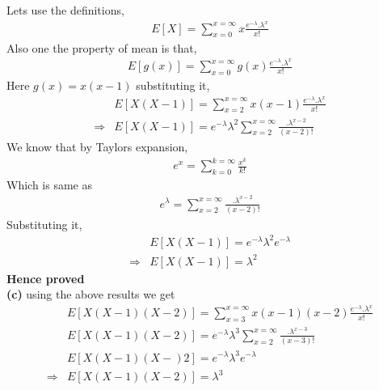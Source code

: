 \documentclass[journal,12pt,twocolumn]{IEEEtran}
\begin{document}
Lets use the definitions,
\begin{align}
E[X]=\sum^{x=\infty}_{x=0}x\frac{e^{-\lambda}.\lambda^{x}}{x!}  
\end{align}
Also one the property of mean is that,
\begin{align}
    E[g(x)]=\sum^{x=\infty}_{x=0}g(x)\frac{e^{-\lambda}.\lambda^{x}}{x!}  
\end{align}
Here $g(x)=x(x-1)$ substituting it,
\begin{align}
    &E[X(X-1)]=\sum^{x=\infty}_{x=2}x(x-1)\frac{e^{-\lambda}.\lambda^{x}}{x!} \\
    \Rightarrow &E[X(X-1)]=e^{-\lambda}\lambda^{2}\sum^{x=\infty}_{x=2}\frac{.\lambda^{x-2}}{(x-2)!}
\end{align}
We know that by Taylors expansion,
\begin{align}
    e^{x}=\sum^{k=\infty}_{k=0}\frac{x^{k}}{k!}
\end{align}
Which is same as 
\begin{align}
    e^{\lambda}=\sum^{x=\infty}_{x=2}\frac{.\lambda^{x-2}}{(x-2)!}
\end{align}
Substituting it,
\begin{align}
    &E[X(X-1)]=e^{-\lambda}\lambda^{2}e^{-\lambda}\\
    \Rightarrow&E[X(X-1)]=\lambda^{2}
\end{align}
\textbf{Hence proved}
\\
\textbf{(c)}  using the above results we get
\begin{align}
&E[X(X-1)(X-2)]=\sum^{x=\infty}_{x=3}x(x-1)(x-2)\frac{e^{-\lambda}.\lambda^{x}}{x!}\\
 &E[X(X-1)(X-2)]=e^{-\lambda}\lambda^{3}\sum^{x=\infty}_{x=2}\frac{.\lambda^{x-3}}{(x-3)!}\\
 &E[X(X-1)(X-)2]=e^{-\lambda}\lambda^{3}e^{-\lambda}\\
 \Rightarrow&E[X(X-1)(X-2)]=\lambda^{3}
\end{align}
     
     
\end{document}
